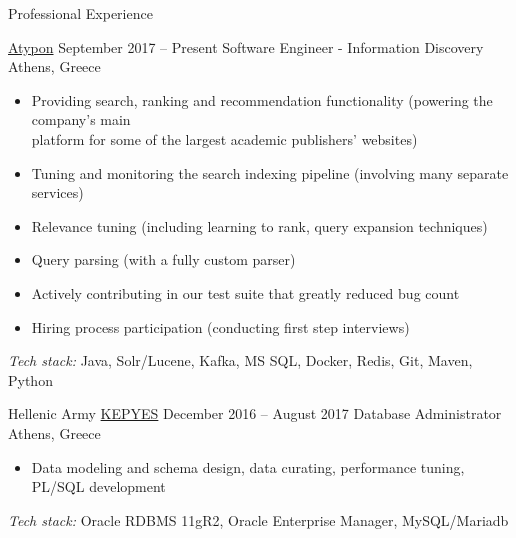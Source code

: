 \documentclass{resume}
\begin{document}
\newcommand{\mytilde}{\raise.17ex\hbox{$\scriptstyle\mathtt{\sim}$}}
\newcommand{\indentitem}{\setlength\itemindent{25pt}}



\begin{rSection}{Professional Experience}

\begin{rSubsection}
  {\href{https://www.atypon.com/about-us/}{Atypon}}
  {September 2017 -- Present}
  {Software Engineer - Information Discovery}
  {Athens, Greece}
    \begin{itemize}[label={-}]
\setlength\itemsep{-0.3em}
   \item Providing search, ranking and recommendation functionality (powering the company's main\\platform for some of the largest academic publishers' websites)
	\item Tuning and monitoring the search indexing pipeline (involving many separate services)
	\item Relevance tuning (including learning to rank, query expansion techniques)
	\item Query parsing (with a fully custom parser)
	\item Actively contributing in our test suite that greatly reduced bug count
	\item Hiring process participation (conducting first step interviews)

    \end{itemize}
   \textit{Tech stack:} Java, Solr/Lucene, Kafka, MS SQL, Docker, Redis, Git, Maven, Python
\end{rSubsection}

\begin{rSubsection}
  {Hellenic Army \href{http://army.gr/el/organosi/monades-ypiresies/kentro-pliroforikis-ypostirixis-ellinikoy-stratoy-kepyes}{KEPYES}}
  {December 2016 -- August 2017}
  {Database Administrator}
  {Athens, Greece}
    \begin{itemize}[label={-}]
\setlength\itemsep{-0.3em}
   \item Data modeling and schema design, data curating, performance tuning, PL/SQL development

    \end{itemize}
   \textit{Tech stack:} Oracle RDBMS 11gR2, Oracle Enterprise Manager, MySQL/Mariadb
 
\end{rSubsection}


\end{rSection}
\end{document}
